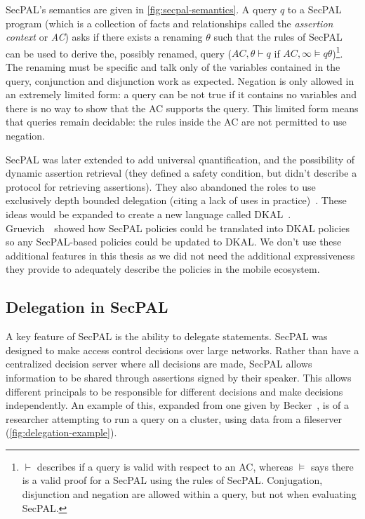 \documentclass[thesis.tex]{subfiles}
\begin{document}
SecPAL's semantics are given in \autoref{fig:secpal-semantics}.  A
query $q$ to a SecPAL program (which is a collection of facts and
relationships called the \emph{assertion context} or \emph{AC}) asks
if there exists a renaming $\theta$ such that the rules of SecPAL can
be used to derive the, possibly renamed, query ($AC,\theta \vdash q$
if $AC,\infty \models q\theta$)\footnote{$\vdash$ describes if a query
  is valid with respect to an AC, whereas $\models$ says there is a
  valid proof for a SecPAL using the rules of SecPAL.  Conjugation,
  disjunction and negation are allowed within a query, but not when
  evaluating SecPAL.}.  The renaming must be specific and talk only of
the variables contained in the query, conjunction and disjunction work
as expected.  Negation is only allowed in an extremely limited form: a
query can be not true if it contains no variables and there is no way
to show that the AC supports the query.  This limited form means that
queries remain decidable: the rules inside the AC are not permitted to
use negation.

SecPAL was later extended to add universal quantification, and the
possibility of dynamic assertion retrieval (they defined a safety
condition, but didn't describe a protocol for retrieving assertions).
They also abandoned the roles to use exclusively depth bounded
delegation (citing a lack of uses in
practice)~\cite{moritz_y_becker_secpal:_2009}.  These ideas would be
expanded to create a new language called
DKAL~\cite{gurevich_dkal:_2008}.  Gruevich~\etal~showed how SecPAL
policies could be translated into DKAL
policies~\cite{gurevich_dkal:_2008} so any SecPAL-based policies could
be updated to DKAL.  We don't use these additional features in this
thesis as we did not need the additional expressiveness they provide
to adequately describe the policies in the mobile ecosystem.

\subsection{Delegation in SecPAL}

A key feature of SecPAL is the ability to delegate statements. SecPAL was
designed to make access control decisions over large networks. Rather than have
a centralized decision server where all decisions are made, SecPAL allows
information to be shared through assertions signed by their speaker. This allows
different principals to be responsible for different decisions and make
decisions independently. An example of this, expanded from one given by
Becker~\cite{becker_secpal:_2010}, is of a researcher attempting to run a query
on a cluster, using data from a fileserver (\autoref{fig:delegation-example}).
\end{document}
